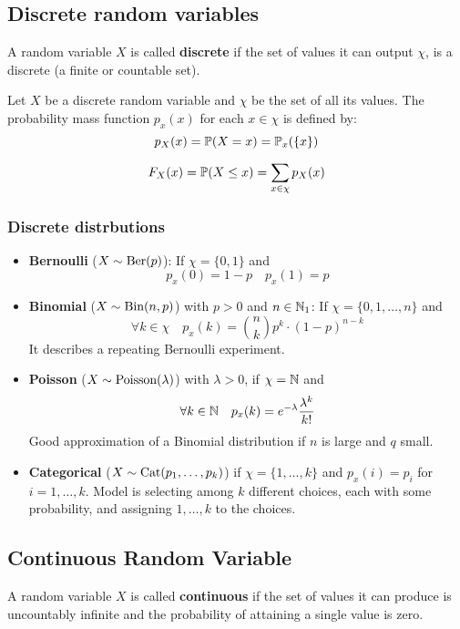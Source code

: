\pagebreak
\subsection{Discrete random variables}
A random variable \(X\) is called \textbf{discrete} if the set of values it can output \(\chi\), is a discrete (a finite or countable set).

\begin{ddefinition*}
  Let \(X\) be a discrete random variable and \(\chi\) be the set of all its values. The probability mass function \(p_x(x)\) for each \(x \in \chi\) is defined by:
  \[p_X(x) = \P(X = x) = \P_x(\{x\})\]
\end{ddefinition*}

\begin{ddefinition*}
  \[F_X(x) = \P(X \leq x) = \sum_{x \in \chi} p_X(x)\]
\end{ddefinition*}

\subsubsection{Discrete distrbutions}
\begin{itemize}
  \item \textbf{Bernoulli} (\(X \sim \Ber(p)\)): If \(\chi = \{0, 1\}\) and
  \[p_x(0) = 1 - p \quad p_x(1) = p\]

  \item \textbf{Binomial} (\(X \sim \Bin(n, p)\)) with \(p > 0\) and \(n \in \N_1\): If \(\chi = \{0, 1, \ldots, n\}\) and
  \[\forall k \in \chi \quad p_x(k) = \binom{n}{k} p^k \cdot (1 - p)^{n -k}\]
  It describes a repeating Bernoulli experiment.

  \item \textbf{Poisson} (\(X \sim \Poisson(\lambda)\)) with \(\lambda > 0\), if \(\chi = \N\) and
  \[\forall k \in \N \quad p_x(k) = e^{-\lambda} \frac{\lambda^k}{k!}\]
  Good approximation of a Binomial distribution if \(n\) is large and \(q\) small.

  \item \textbf{Categorical} (\(X \sim \Cat(p_1, \ldots, p_k)\)) if \(\chi = \{1, \ldots, k\}\) and \(p_x(i) = p_i\) for \(i = 1, \ldots, k\). Model is selecting among \(k\) different choices, each with some probability, and assigning \(1, \ldots, k\) to the choices.
\end{itemize}

\pagebreak
\subsection{Continuous Random Variable}
A random variable \(X\) is called \textbf{continuous} if the set of values it can produce is uncountably infinite and the probability of attaining a single value is zero.

